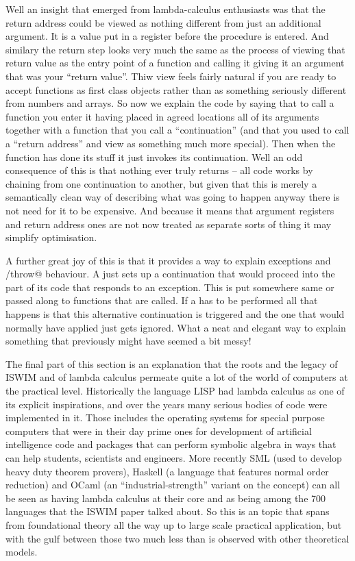 Well an insight that emerged from lambda-calculus enthusiasts was that the
return address could be viewed as nothing different from just an additional
argument. It is a value put in a register before the procedure is entered.
And similary the return step looks very much the same as the process of
viewing that return value as the entry point of a function and calling
it giving it an argument that was your ``return value''. Thiw view
feels fairly natural if you are ready to accept functions as first class
objects rather than as something seriously different from numbers and
arrays. So now we explain the code by saying that to call a function
you enter it having placed in agreed locations all of its arguments
together with a function that you call a ``continuation'' (and that
you used to call a ``return address'' and view as something much more special).
Then when the function has done its stuff it just invokes its continuation.
Well an odd consequence of this is that nothing ever truly returns --
all code works by chaining from one continuation to another, but given that
this is merely a semantically clean way of describing what was going
to happen anyway there is not need for it to be expensive. And because
it means that argument registers and return address ones are not now
treated as separate sorts of thing it may simplify optimisation.

A further great joy of this is that it provides a way to explain
exceptions and \verb@catch/throw@ behaviour. A \verb@catch@ just sets
up a continuation that would proceed into the part of its code that
responds to an exception. This is put somewhere same or passed along
to functions that are called. If a \verb@thow@ has to be performed all
that happens is that this alternative continuation is triggered and the
one that would normally have applied just gets ignored. What a neat and
elegant way to explain something that previously might have seemed
a bit messy!

The final part of this section is an explanation that the
roots and the legacy of ISWIM and of lambda calculus permeate
quite a lot of the world of computers at the practical level.
Historically the language LISP\cite{lisp} had lambda calculus as one
of its explicit inspirations, and over the years many serious bodies of
code were implemented in it. Those includes the operating systems for
special purpose computers that were in their day prime ones for development
of artificial intelligence code and packages that can perform symbolic
algebra in ways that can help students, scientists and engineers. More
recently SML\cite{SML} (used to develop heavy duty theorem provers),
Haskell\cite{Haskell} (a language that features normal order reduction)
and OCaml\cite{OCaml} (an ``industrial-strength'' variant on the concept) can
all be seen as having lambda calculus at their core and as being
among the 700 languages that the ISWIM paper talked about. So this is
an topic that spans from foundational theory all the way up to
large scale practical application, but with the gulf between those two
much less than is observed with other theoretical models.

